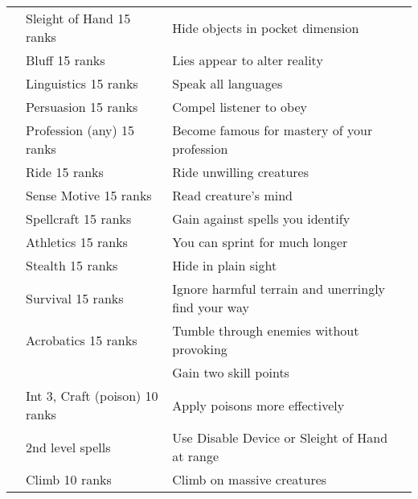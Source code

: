 \begin{longtabuwrapper}
\begin{longtabu}{>{\lcol}p{10em} >{\lcol}p{15em} >{\lcol}X >{\lcol}p{3em}}
         & Sleight of Hand 15 ranks & Hide objects in pocket dimension &  \\
         & Bluff 15 ranks & Lies appear to alter reality &  \\
         & Linguistics 15 ranks & Speak all languages &  \\
         & Persuasion 15 ranks & Compel listener to obey &  \\
         & Profession (any) 15 ranks & Become famous for mastery of your profession &  \\
         & Ride 15 ranks & Ride unwilling creatures &  \\
         & Sense Motive 15 ranks & Read creature's mind &  \\
         & Spellcraft 15 ranks & Gain  against spells you identify &  \\
         & Athletics 15 ranks & You can sprint for much longer &  \\
         & Stealth 15 ranks & Hide in plain sight &  \\
         & Survival 15 ranks & Ignore harmful terrain and unerringly find your way &  \\
         & Acrobatics 15 ranks & Tumble through enemies without provoking &  \\
         & \x & Gain two skill points &  \\
         & Int 3, Craft (poison) 10 ranks & Apply poisons more effectively &  \\
         &  2nd level spells & Use Disable Device or Sleight of Hand at range &  \\
         & Climb 10 ranks & Climb on massive creatures &  \\

\end{longtabu}
\end{longtabuwrapper}

